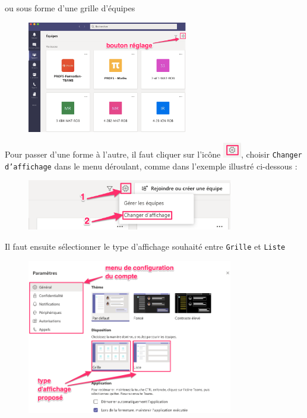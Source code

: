 \newpage
ou sous forme d'une grille d'équipes 

\begin{figure}[H]
\includegraphics[width=7cm]{./images/teams/accueil_grille}
\centering
\end{figure}

Pour passer d'une forme à l'autre, il faut cliquer sur l'icône \includegraphics[width=0.8cm]{./images/teams/bouton_parametres}, choisir \texttt{Changer d'affichage} dans le menu déroulant, comme dans l'exemple illustré ci-dessous :

\begin{figure}[H]
\includegraphics[width=9cm]{./images/teams/changement_liste}
\centering
\end{figure}

Il faut ensuite sélectionner le type d'affichage souhaité entre \texttt{Grille} et \texttt{Liste}

\begin{figure}[H]
\includegraphics[width=9cm]{./images/teams/choix_parametre}
\centering
\end{figure}

